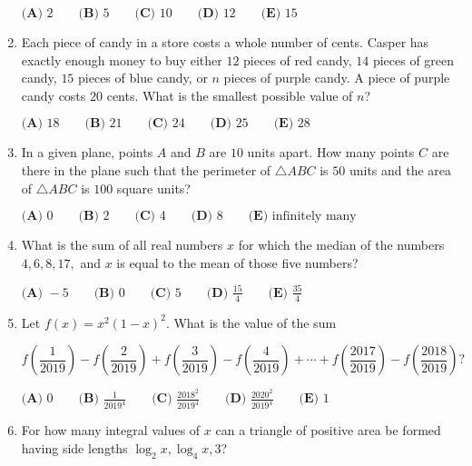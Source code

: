 \documentclass{article}
\begin{document}
\begin{enumerate}[label=\arabic*., itemsep=0.5em]
\(\textbf{(A) } 2 \qquad \textbf{(B) } 5 \qquad \textbf{(C) } 10\qquad \textbf{(D) } 12 \qquad \textbf{(E) } 15\)\par \vspace{0.5em}\item Each piece of candy in a store costs a whole number of cents. Casper has exactly enough money to buy either \(12\) pieces of red candy, \(14\) pieces of green candy, \(15\) pieces of blue candy, or \(n\) pieces of purple candy. A piece of purple candy costs \(20\) cents. What is the smallest possible value of \(n\)?

\(\textbf{(A) } 18 \qquad \textbf{(B) } 21 \qquad \textbf{(C) } 24\qquad \textbf{(D) } 25 \qquad \textbf{(E) } 28\)\par \vspace{0.5em}\item In a given plane, points \(A\) and \(B\) are \(10\) units apart. How many points \(C\) are there in the plane such that the perimeter of \(\triangle ABC\) is \(50\) units and the area of \(\triangle ABC\) is \(100\) square units?

\(\textbf{(A) }0\qquad\textbf{(B) }2\qquad\textbf{(C) }4\qquad\textbf{(D) }8\qquad\textbf{(E) }\text{infinitely many}\)\par \vspace{0.5em}\item What is the sum of all real numbers \(x\) for which the median of the numbers \(4,6,8,17,\) and \(x\) is equal to the mean of those five numbers?

\(\textbf{(A) } -5 \qquad\textbf{(B) } 0 \qquad\textbf{(C) } 5 \qquad\textbf{(D) } \frac{15}{4} \qquad\textbf{(E) } \frac{35}{4}\)\par \vspace{0.5em}\item Let \(f(x) = x^{2}(1-x)^{2}\). What is the value of the sum


\begin{equation*}
f \left(\frac{1}{2019} \right)-f  \left(\frac{2}{2019} \right)+f \left(\frac{3}{2019} \right)-f \left(\frac{4}{2019} \right)+\cdots + f \left(\frac{2017}{2019} \right) - f \left(\frac{2018}{2019} \right)?
\end{equation*}


\(\textbf{(A) }0\qquad\textbf{(B) }\frac{1}{2019^{4}}\qquad\textbf{(C) }\frac{2018^{2}}{2019^{4}}\qquad\textbf{(D) }\frac{2020^{2}}{2019^{4}}\qquad\textbf{(E) }1\)\par \vspace{0.5em}\item For how many integral values of \(x\) can a triangle of positive area be formed having side lengths \(
\log_{2} x, \log_{4} x, 3\)?


\end{enumerate}
\end{document}
